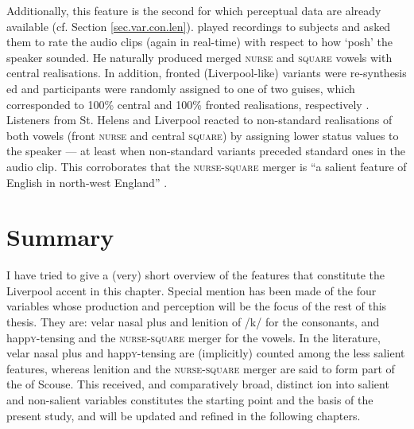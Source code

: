 Additionally, this feature is the second for which perceptual data are already available (cf. Section \ref{sec.var.con.len}).
\textcite{watsonclark2013} played recordings to subjects and asked them to rate the audio clips (again in real-time) with respect to how `posh' the speaker sounded.
He naturally produced merged \textsc{nurse} and \textsc{square} vowels with central realisations.
In addition, fronted (Liverpool-like) variants were re-synthesis ed and participants were randomly assigned to one of two guises, which corresponded to 100\% central and 100\% fronted realisations, respectively \parencite[cf.][305--306]{watsonclark2013}.
Listeners from St. Helens and Liverpool reacted to non-standard realisations of both vowels (front \textsc{nurse} and central \textsc{square}) by assigning lower status values to the speaker --- at least when non-standard variants preceded standard ones in the audio clip.
This corroborates that the \textsc{nurse}-\textsc{square} merger is ``a salient  feature of English in north-west England'' \parencite[cf.][317--320]{watsonclark2013}.

	\section{Summary}

I have tried to give a (very) short overview of the features that constitute the Liverpool accent in this chapter.
Special mention has been made of the four variables whose production and perception will be the focus of the rest of this thesis.
They are: velar nasal plus and lenition of /k/ for the consonants, and happ\textsc{y}-tensing and the \textsc{nurse}-\textsc{square} merger for the vowels.
In the literature, velar nasal plus and happ\textsc{y}-tensing are (implicitly) counted among the less salient  features, whereas lenition and the \textsc{nurse}-\textsc{square} merger are said to form part of the  of Scouse.
This received, and comparatively broad, distinct ion into salient  and non-salient  variables constitutes the starting point and the basis of the present study, and will be updated and refined in the following chapters.